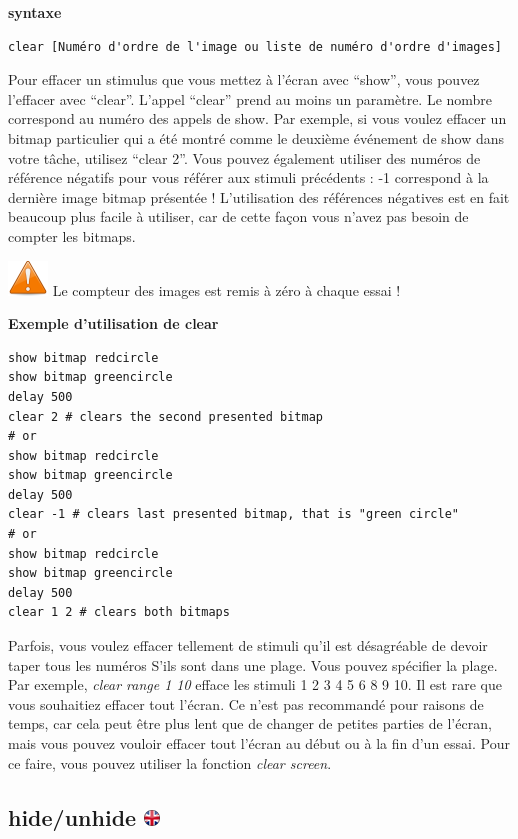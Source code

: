 \documentclass[
]{book}
\begin{document}
\textbf{syntaxe}

\begin{verbatim}
clear [Numéro d'ordre de l'image ou liste de numéro d'ordre d'images]
\end{verbatim}

Pour effacer un stimulus que vous mettez à l'écran avec ``show'', vous
pouvez l'effacer avec ``clear''. L'appel ``clear'' prend au moins un
paramètre. Le nombre correspond au numéro des appels de show. Par
exemple, si vous voulez effacer un bitmap particulier qui a été montré
comme le deuxième événement de show dans votre tâche, utilisez ``clear
2''. Vous pouvez également utiliser des numéros de référence négatifs
pour vous référer aux stimuli précédents : -1 correspond à la dernière
image bitmap présentée ! L'utilisation des références négatives est en
fait beaucoup plus facile à utiliser, car de cette façon vous n'avez pas
besoin de compter les bitmaps.

\includegraphics{img/attention.png} Le compteur des images est remis à
zéro à chaque essai !

\textbf{Exemple d'utilisation de clear}

\begin{verbatim}
show bitmap redcircle
show bitmap greencircle
delay 500
clear 2 # clears the second presented bitmap
# or
show bitmap redcircle
show bitmap greencircle
delay 500
clear -1 # clears last presented bitmap, that is "green circle"
# or
show bitmap redcircle
show bitmap greencircle
delay 500
clear 1 2 # clears both bitmaps
\end{verbatim}

Parfois, vous voulez effacer tellement de stimuli qu'il est désagréable
de devoir taper tous les numéros S'ils sont dans une plage. Vous pouvez
spécifier la plage. Par exemple, \emph{clear range 1 10} efface les
stimuli 1 2 3 4 5 6 8 9 10. Il est rare que vous souhaitiez effacer tout
l'écran. Ce n'est pas recommandé pour raisons de temps, car cela peut
être plus lent que de changer de petites parties de l'écran, mais vous
pouvez vouloir effacer tout l'écran au début ou à la fin d'un essai.
Pour ce faire, vous pouvez utiliser la fonction \emph{clear screen}.

\hypertarget{hideunhide}{%
\subsection[hide/unhide ]{\texorpdfstring{hide/unhide
\href{https://www.psytoolkit.org/doc3.2.0/syntax.html\#task-hide}{\protect\includegraphics{img/ukflag.png}}}{hide/unhide }}\label{hideunhide}}
\end{document}
